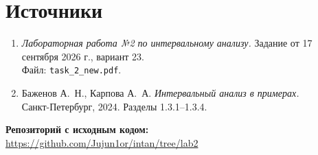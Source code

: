 \documentclass[12pt,a4paper]{article}
\begin{document}
\section*{Источники}
\begin{enumerate}
\item \textit{Лабораторная работа №2 по интервальному анализу.}
Задание от 17 сентября 2026 г., вариант 23.\\
Файл: \texttt{task\_2\_new.pdf}.

\item Баженов А.~Н., Карпова А.~А.
\textit{Интервальный анализ в примерах.}\\
Санкт-Петербург, 2024. Разделы 1.3.1--1.3.4.
\end{enumerate}

\noindent\textbf{Репозиторий с исходным кодом:}\\[2mm]
\url{https://github.com/Jujun1or/intan/tree/lab2}
\end{document}
